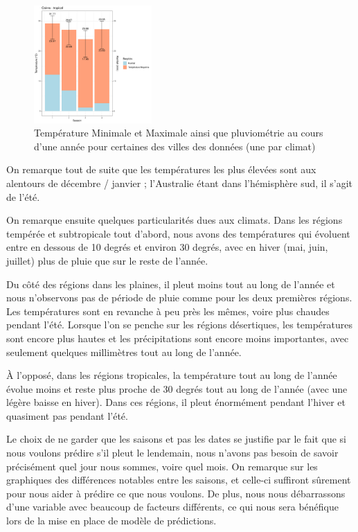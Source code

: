 \documentclass{article}
\begin{document}
\begin{figure}[p]
        \includegraphics[page=1,width=0.4\textwidth]{Images/temp_and_rainfall/Temp_and_Rainfalltropical.pdf}
    \caption{Température Minimale et Maximale ainsi que pluviométrie au cours d'une année pour certaines des villes des données (une par climat)}
    \label{fig:temp_and_rainfall}
\end{figure}

On remarque tout de suite que les températures les plus élevées sont aux alentours de décembre / janvier ; l'Australie étant dans l'hémisphère sud, il s'agit de l'été. 

On remarque ensuite quelques particularités dues aux climats. Dans les régions tempérée et subtropicale tout d'abord, nous avons des températures qui évoluent entre en dessous de 10 degrés et environ 30 degrés, avec en hiver (mai, juin, juillet) plus de pluie que sur le reste de l'année.

Du côté des régions dans les plaines, il pleut moins tout au long de l'année et nous n'observons pas de période de pluie comme pour les deux premières régions. Les températures sont en revanche à peu près les mêmes, voire plus chaudes pendant l'été. Lorsque l'on se penche sur les régions désertiques, les températures sont encore plus hautes et les précipitations sont encore moins importantes, avec seulement quelques millimètres tout au long de l'année. 

À l'opposé, dans les régions tropicales, la température tout au long de l'année évolue moins et reste plus proche de 30 degrés tout au long de l'année (avec une légère baisse en hiver). Dans ces régions, il pleut énormément pendant l'hiver et quasiment pas pendant l'été.

Le choix de ne garder que les saisons et pas les dates se justifie par le fait que si nous voulons prédire s'il pleut le lendemain, nous n'avons pas besoin de savoir précisément quel jour nous sommes, voire quel mois. On remarque sur les graphiques des différences notables entre les saisons, et celle-ci suffiront sûrement pour nous aider à prédire ce que nous voulons. De plus, nous nous débarrassons d'une variable avec beaucoup de facteurs différents, ce qui nous sera bénéfique lors de la mise en place de modèle de prédictions.
\end{document}
